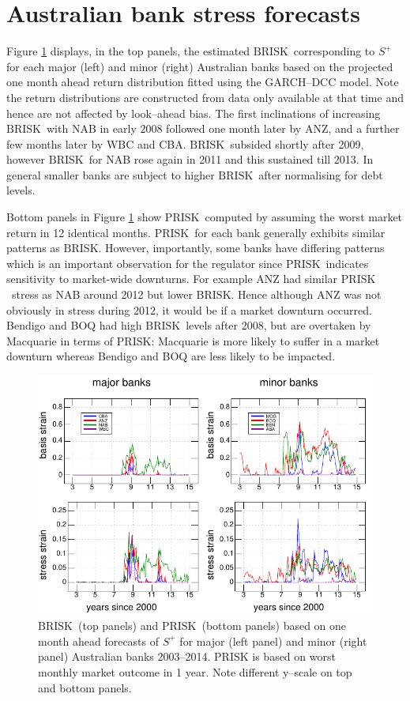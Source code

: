 \documentclass[authoryear]{elsarticle}
\newcommand{\br}{\ensuremath{\mathrm{BRISK}}}
\newcommand{\pr}{\ensuremath{\mathrm{PRISK}}}
\newcommand{\fref}[1]{Figure \ref{#1}}
\begin{document}
\section{Australian bank stress forecasts}\label{simulate1}

\fref{default} displays, in the top panels, the estimated \br\  corresponding to $S^+$ for each major (left) and minor (right) Australian banks based on the projected one month ahead return distribution fitted using the GARCH--DCC model.  Note the return distributions are constructed from data only available at that time and hence are not affected by look--ahead bias.  The first inclinations of increasing \br\ with NAB in early 2008 followed one month later by ANZ, and  a further few months later by WBC and CBA. \br\ subsided shortly after 2009, however \br\  for NAB rose again in 2011 and this sustained till 2013.  In general smaller banks are subject to higher \br\  after normalising for debt levels.


Bottom panels in \fref{default} show \pr\ computed by assuming the worst market return in 12 identical months. \pr\ for each bank generally exhibits similar patterns as \br. However, importantly, some banks have differing patterns which is an important observation for the regulator since \pr\ indicates sensitivity to market-wide downturns. For example ANZ had similar \pr\ stress as NAB around 2012 but lower \br. Hence although ANZ was not obviously in stress during 2012, it would be if a market downturn occurred. Bendigo and BOQ had high \br\ levels after 2008, but are overtaken by Macquarie in terms of \pr: Macquarie is more likely to suffer in a market downturn whereas Bendigo and BOQ are less likely to be impacted.

\begin{figure}[htbp]
\begin{center}
\includegraphics[width=12cm]{figures/default.pdf}
\caption{\br\ (top panels) and \pr\ (bottom panels) based on one month ahead  forecasts of $S^+$ for   major (left panel) and  minor (right panel)  Australian banks 2003--2014.  PRISK is based on worst monthly market outcome in 1 year.  Note different y--scale on top and bottom panels.}\label{default}
\end{center}
\end{figure}
\end{document}
